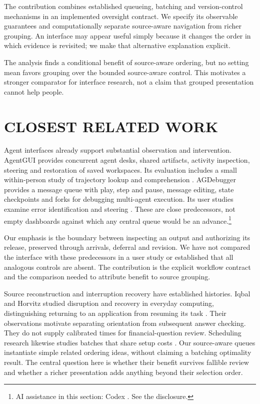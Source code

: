 \documentclass[a4paper,twoside]{article}
\newcommand{\aicredit}{\footnote{AI assistance in this section: Codex \cite{codex}. See the disclosure.}}
\begin{document}
The contribution combines established queueing, batching and version-control mechanisms in an implemented oversight contract. We specify its observable guarantees and computationally separate source-aware navigation from richer grouping. An interface may appear useful simply because it changes the order in which evidence is revisited; we make that alternative explanation explicit.



The analysis finds a conditional benefit of source-aware ordering, but no setting mean favors grouping over the bounded source-aware control. This motivates a stronger comparator for interface research, not a claim that grouped presentation cannot help people.

\section{CLOSEST RELATED WORK}
\label{sec:related}
Agent interfaces already support substantial observation and intervention. AgentGUI provides concurrent agent desks, shared artifacts, activity inspection, steering and restoration of saved workspaces. Its evaluation includes a small within-person study of trajectory lookup and comprehension \cite{agentgui}. AGDebugger provides a message queue with play, step and pause, message editing, state checkpoints and forks for debugging multi-agent execution. Its user studies examine error identification and steering \cite{agdebugger}. These are close predecessors, not empty dashboards against which any central queue would be an advance.\aicredit

Our emphasis is the boundary between inspecting an output and authorizing its release, preserved through arrivals, deferral and revision. We have not compared the interface with these predecessors in a user study or established that all analogous controls are absent. The contribution is the explicit workflow contract and the comparison needed to attribute benefit to source grouping.

Source reconstruction and interruption recovery have established histories. Iqbal and Horvitz studied disruption and recovery in everyday computing, distinguishing returning to an application from resuming its task \cite{iqbal}. Their observations motivate separating orientation from subsequent answer checking. They do not supply calibrated times for financial-question review. Scheduling research likewise studies batches that share setup costs \cite{potts}. Our source-aware queues instantiate simple related ordering ideas, without claiming a batching optimality result. The central question here is whether their benefit survives fallible review and whether a richer presentation adds anything beyond their selection order.
\end{document}
